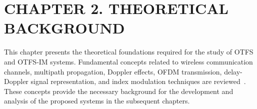 \section*{CHAPTER 2. THEORETICAL BACKGROUND}

\setcounter{section}{2}
\setcounter{subsection}{0}
\setcounter{subsubsection}{0}
\setcounter{figure}{0}
\setcounter{table}{0}
\setcounter{equation}{0}

\renewcommand{\thefigure}{2.\arabic{figure}}
\renewcommand{\thetable}{2.\arabic{table}}
\renewcommand{\theequation}{2.\arabic{equation}}
\renewcommand{\theHfigure}{2.\arabic{figure}}
\renewcommand{\theHtable}{2.\arabic{table}}
\renewcommand{\theHequation}{2.\arabic{equation}}

This chapter presents the theoretical foundations required for the study of OTFS and OTFS-IM systems. Fundamental concepts related to wireless communication channels, multipath propagation, Doppler effects, OFDM transmission, delay-Doppler signal representation, and index modulation techniques are reviewed~\cite{Hong2019OTFSTutorial,Basar2016IndexMod5G,Wen2017OFDMIM}. These concepts provide the necessary background for the development and analysis of the proposed systems in the subsequent chapters.














\newpage
